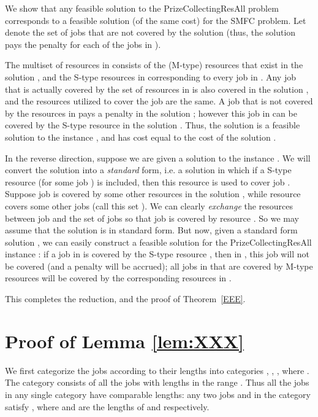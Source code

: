 \documentclass[11pt]{article}
\newcommand{\PCResAll}{{\sc PrizeCollectingResAll}}
\newcommand{\smfc}{{\sc SMFC}}
\begin{document}
We show that 
any feasible solution  to the {\PCResAll} problem corresponds to a feasible solution  (of the same cost) for the {\smfc} problem. Let  denote the set of jobs that are not covered by the 
solution  (thus, the solution pays the penalty for each of the jobs in ).

The multiset of resources in  consists of the (M-type) resources that exist in the solution , and 
the S-type resources  in  corresponding to every job  in . 
Any job  that is actually covered by the set of resources in  is also covered
in the solution , and the resources utilized to cover the job are the same. A job  that is 
not covered by the resources in  pays a penalty  in the solution ; however this 
job  in  can be covered by the S-type resource  in the solution 
. Thus, the solution  is a feasible solution to the instance , and has cost 
equal to the cost of the solution . 

In the reverse direction, suppose we are given a solution  to the instance . 
We will convert the solution into a {\em standard} form, i.e. a solution in which if a 
S-type resource  (for some job ) is included, then this resource is used to 
cover job . Suppose job  is covered by some other resources in the solution 
, while resource  covers some other jobs (call this set ). We can clearly {\em exchange}
the resources between job  and the set of jobs  so that job  is covered by
resource . So we may assume that the solution  is in standard form. 
But now, given a standard form solution , we can easily construct a 
feasible solution  for the {\PCResAll} instance : if a job  in  
is covered by the S-type resource , then in , this job will not be 
covered (and a penalty  will be accrued); all jobs  in  that are 
covered by M-type resources will be covered by the corresponding resources
in .

This completes the reduction, and the proof of Theorem~\ref{EEE}.




\appendix
\section{Proof of Lemma \ref{lem:XXX}}
\label{sec:DDD}
We first categorize the jobs according to their  lengths into  categories , , , where 
.
The category  consists of all the jobs with lengths in the range .
Thus all the jobs in any single category have comparable lengths: 
any two jobs  and  in the category satisfy , where 
 and  are the lengths of  and  respectively.
\end{document}
